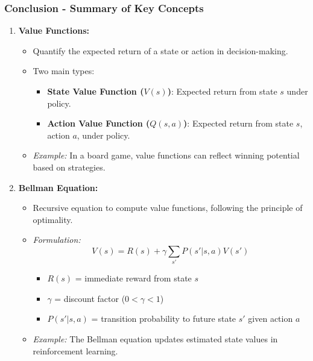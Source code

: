 \documentclass{beamer}
\begin{document}
\begin{frame}[fragile]
    \frametitle{Conclusion - Summary of Key Concepts}
    \begin{enumerate}
        \item \textbf{Value Functions:}
        \begin{itemize}
            \item Quantify the expected return of a state or action in decision-making.
            \item Two main types:
                \begin{itemize}
                    \item \textbf{State Value Function ($V(s)$)}: Expected return from state $s$ under policy.
                    \item \textbf{Action Value Function ($Q(s, a)$)}: Expected return from state $s$, action $a$, under policy.
                \end{itemize}
            \item \textit{Example:} In a board game, value functions can reflect winning potential based on strategies.
        \end{itemize}

        \item \textbf{Bellman Equation:}
        \begin{itemize}
            \item Recursive equation to compute value functions, following the principle of optimality.
            \item \textit{Formulation:}
            \[
            V(s) = R(s) + \gamma \sum_{s'} P(s'|s, a)V(s')
            \]
            \begin{itemize}
                \item $R(s)$ = immediate reward from state $s$
                \item $\gamma$ = discount factor ($0 < \gamma < 1$)
                \item $P(s'|s, a)$ = transition probability to future state $s'$ given action $a$
            \end{itemize}
            \item \textit{Example:} The Bellman equation updates estimated state values in reinforcement learning.
        \end{itemize}
    \end{enumerate}
\end{frame}
\end{document}
